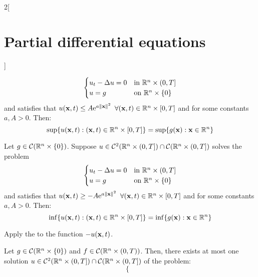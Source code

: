 \documentclass[../../../main_math.tex]{subfiles}
\begin{document}
\begin{multicols}{2}[\section{Partial differential equations}]
\begin{theorem}
    $$
      \begin{cases}
        u_{t}  -\laplacian{u} = 0 & \text{in $\RR^n\times (0,T]$} \\
        u=g                       & \text{on $\RR^n\times \{0\}$}
      \end{cases}
    $$ and satisfies that $u(\vf{x},t)\leq A\exp{a\norm{\vf{x}}^2}$ $\forall (\vf{x},t)\in\RR^n\times [0,T]$ and for some constants $a, A> 0$. Then:
    $$\displaystyle\sup\{u(\vf{x},t):(\vf{x},t)\in\RR^n\times[0,T]\}=\sup\{g(\vf{x}):\vf{x}\in\RR^n\}$$
  \end{theorem}
  \begin{theorem}\label{PDE:Cauchymin}
    Let $g\in\mathcal{C}(\RR^n\times \{0\})$. Suppose $u\in\mathcal{C}^2(\RR^n\times (0,T])\cap\mathcal{C}(\RR^n\times (0,T])$ solves the problem
    $$
      \begin{cases}
        u_{t}  -\laplacian{u} = 0 & \text{in $\RR^n\times (0,T]$} \\
        u=g                       & \text{on $\RR^n\times \{0\}$}
      \end{cases}
    $$ and satisfies that $u(\vf{x},t)\geq -A\exp{a\norm{\vf{x}}^2}$ $\forall (\vf{x},t)\in\RR^n\times [0,T]$ and for some constants $a, A> 0$. Then:
    $$\displaystyle\inf\{u(\vf{x},t):(\vf{x},t)\in\RR^n\times[0,T]\}=\inf\{g(\vf{x}):\vf{x}\in\RR^n\}$$
  \end{theorem}
  \begin{sproof}
    Apply the  to the function $-u(\vf{x},t)$.
  \end{sproof}
  \begin{theorem}
    Let $g\in\mathcal{C}(\RR^n\times \{0\})$ and $f\in\mathcal{C}(\RR^n\times (0,T))$. Then, there exists at most one solution $u\in\mathcal{C}^2(\RR^n\times (0,T])\cap\mathcal{C}(\RR^n\times (0,T])$ of the problem:
    $$
      \begin{cases}

\end{cases}$$
\end{theorem}
\end{multicols}
\end{document}
